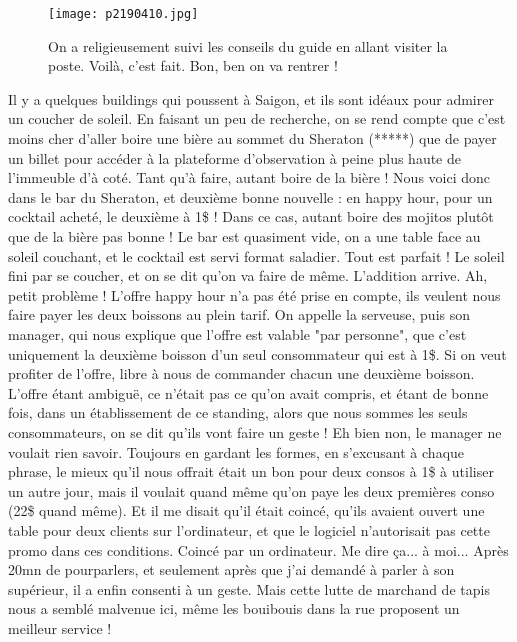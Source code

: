 \documentclass{book}
\begin{document}
\begin{figure}[h]
\centering
\texttt{[image: p2190410.jpg]}
\caption*{On a religieusement suivi les conseils du guide en allant visiter la poste. Voilà, c'est fait. Bon, ben on va rentrer !}
\end{figure}

Il y a quelques buildings qui poussent à Saigon, et ils sont idéaux pour admirer un coucher de soleil. En faisant un peu de recherche, on se rend compte que c'est moins cher d'aller boire une bière au sommet du Sheraton (*****) que de payer un billet pour accéder à la plateforme d'observation à peine plus haute de l'immeuble d'à coté. Tant qu'à faire, autant boire de la bière ! Nous voici donc dans le bar du Sheraton, et deuxième bonne nouvelle : en happy hour, pour un cocktail acheté, le deuxième à 1\$ ! Dans ce cas, autant boire des mojitos plutôt que de la bière pas bonne ! Le bar est quasiment vide, on a une table face au soleil couchant, et le cocktail est servi format saladier. Tout est parfait ! Le soleil fini par se coucher, et on se dit qu'on va faire de même. L'addition arrive. Ah, petit problème ! L'offre happy hour n'a pas été prise en compte, ils veulent nous faire payer les deux boissons au plein tarif. On appelle la serveuse, puis son manager, qui nous explique que l'offre est valable "par personne", que c'est uniquement la deuxième boisson d'un seul consommateur qui est à 1\$. Si on veut profiter de l'offre, libre à nous de commander chacun une deuxième boisson. L'offre étant ambiguë, ce n'était pas ce qu'on avait compris, et étant de bonne fois, dans un établissement de ce standing, alors que nous sommes les seuls consommateurs, on se dit qu'ils vont faire un geste ! Eh bien non, le manager ne voulait rien savoir. Toujours en gardant les formes, en s'excusant à chaque phrase, le mieux qu'il nous offrait était un bon pour deux consos à 1\$ à utiliser un autre jour, mais il voulait quand même qu'on paye les deux premières conso (22\$ quand même). Et il me disait qu'il était coincé, qu'ils avaient ouvert une table pour deux clients sur l'ordinateur, et que le logiciel n'autorisait pas cette promo dans ces conditions. Coincé par un ordinateur. Me dire ça... à moi... Après 20mn de pourparlers, et seulement après que j'ai demandé à parler à son supérieur, il a enfin consenti à un geste. Mais cette lutte de marchand de tapis nous a semblé malvenue ici, même les bouibouis dans la rue proposent un meilleur service !
\end{document}
